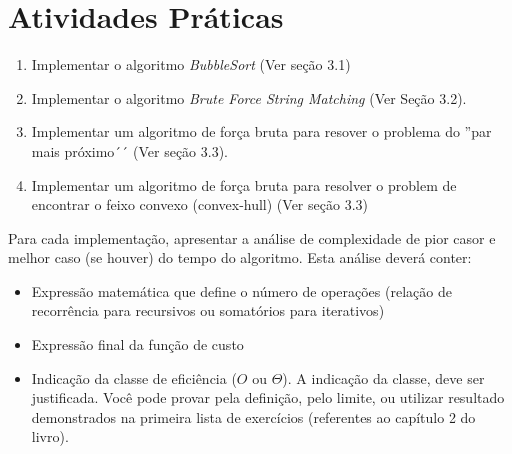 \documentclass{article}
\begin{document}
\section{Atividades Práticas}

\begin{enumerate}
    \item Implementar o algoritmo \textit{BubbleSort} (Ver seção 3.1)
    \item Implementar o algoritmo \textit{Brute Force String Matching} (Ver Seção 3.2).
    \item Implementar um algoritmo de força bruta para resover o problema do ''par mais próximo´´ (Ver seção 3.3).
    \item Implementar um algoritmo de força bruta para resolver o problem de encontrar o feixo convexo (convex-hull) (Ver seção 3.3)
\end{enumerate}

Para cada implementação, apresentar a análise de complexidade de pior casor e melhor caso (se houver) do tempo do algoritmo. Esta análise deverá conter:

\begin{itemize}
    \item Expressão matemática que define o número de operações (relação de recorrência para recursivos ou somatórios para iterativos) 
    \item Expressão final da função de custo
    \item Indicação da classe de eficiência ($O$ ou $\Theta$). A indicação da classe, deve ser justificada. Você pode provar pela definição, pelo limite, ou utilizar resultado demonstrados na primeira lista de exercícios (referentes ao capítulo 2 do livro).
\end{itemize}




%
%
\end{document}

